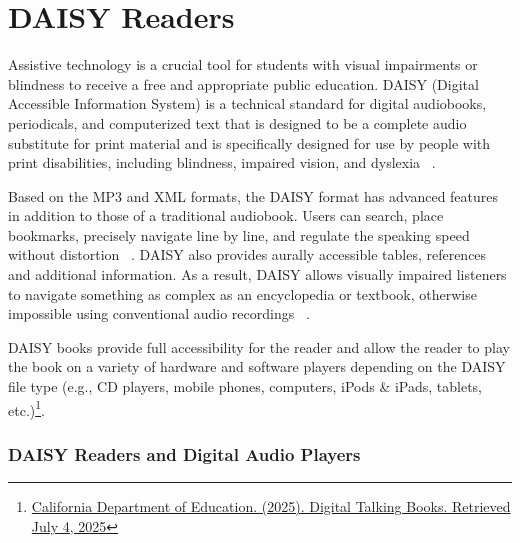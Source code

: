 \section{DAISY Readers}\label{sec:daisy-readers}

Assistive technology is a crucial tool for students with visual impairments or blindness to receive a free and appropriate public education. DAISY (Digital Accessible Information System) is a technical standard for digital audiobooks, periodicals, and computerized text that is designed to be a complete audio substitute for print material and is specifically designed for use by people with print disabilities, including blindness, impaired vision, and dyslexia~ \cite{Wikipedia2024}.

Based on the MP3 and XML formats, the DAISY format has advanced features in addition to those of a traditional audiobook. Users can search, place bookmarks, precisely navigate line by line, and regulate the speaking speed without distortion~ \cite{Wikipedia2024}. DAISY also provides aurally accessible tables, references and additional information. As a result, DAISY allows visually impaired listeners to navigate something as complex as an encyclopedia or textbook, otherwise impossible using conventional audio recordings~ \cite{MDPI2022}.

DAISY books provide full accessibility for the reader and allow the reader to play the book on a variety of hardware and software players depending on the DAISY file type (e.g., CD players, mobile phones, computers, iPods \& iPads, tablets, etc.)\footnote{\href{https://www.cde.ca.gov/re/pn/sm/dtbdefinitions.asp}{California Department of Education. (2025). Digital Talking Books. Retrieved July 4, 2025}}.

\subsubsection{DAISY Readers and Digital Audio Players}


